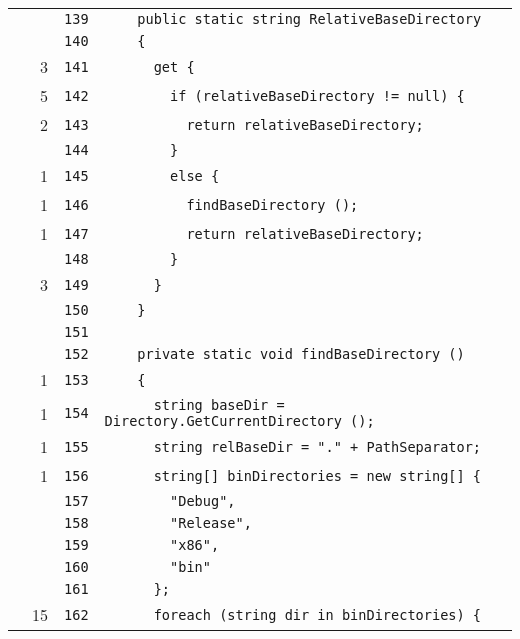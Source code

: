 \documentclass[a4paper,10pt]{article}
\begin{document}
\begin{longtable}[l]{lrrl}
\cellcolor{gray} &  & \verb~139~ & \verb~    public static string RelativeBaseDirectory~\\
\cellcolor{gray} &  & \verb~140~ & \verb~    {~\\
\cellcolor{green} & 3 & \verb~141~ & \verb~      get {~\\
\cellcolor{green} & 5 & \verb~142~ & \verb~        if (relativeBaseDirectory != null) {~\\
\cellcolor{green} & 2 & \verb~143~ & \verb~          return relativeBaseDirectory;~\\
\cellcolor{gray} &  & \verb~144~ & \verb~        }~\\
\cellcolor{green} & 1 & \verb~145~ & \verb~        else {~\\
\cellcolor{green} & 1 & \verb~146~ & \verb~          findBaseDirectory ();~\\
\cellcolor{green} & 1 & \verb~147~ & \verb~          return relativeBaseDirectory;~\\
\cellcolor{gray} &  & \verb~148~ & \verb~        }~\\
\cellcolor{green} & 3 & \verb~149~ & \verb~      }~\\
\cellcolor{gray} &  & \verb~150~ & \verb~    }~\\
\cellcolor{gray} &  & \verb~151~ & \verb~~\\
\cellcolor{gray} &  & \verb~152~ & \verb~    private static void findBaseDirectory ()~\\
\cellcolor{green} & 1 & \verb~153~ & \verb~    {~\\
\cellcolor{green} & 1 & \verb~154~ & \verb~      string baseDir = Directory.GetCurrentDirectory ();~\\
\cellcolor{green} & 1 & \verb~155~ & \verb~      string relBaseDir = "." + PathSeparator;~\\
\cellcolor{green} & 1 & \verb~156~ & \verb~      string[] binDirectories = new string[] {~\\
\cellcolor{gray} &  & \verb~157~ & \verb~        "Debug",~\\
\cellcolor{gray} &  & \verb~158~ & \verb~        "Release",~\\
\cellcolor{gray} &  & \verb~159~ & \verb~        "x86",~\\
\cellcolor{gray} &  & \verb~160~ & \verb~        "bin"~\\
\cellcolor{gray} &  & \verb~161~ & \verb~      };~\\
\cellcolor{green} & 15 & \verb~162~ & \verb~      foreach (string dir in binDirectories) {~\\

\end{longtable}
\end{document}
